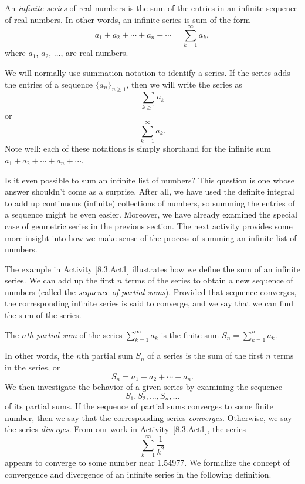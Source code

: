 \begin{definition} An \emph{infinite series} of real numbers is the sum of the entries in an infinite sequence of real numbers. In other words, an infinite series is sum of the form
 \[a_1+a_2+ \cdots + a_n + \cdots = \sum_{k=1}^{\infty} a_k,\]
where $a_1$, $a_2$, $\ldots$, are real numbers. 
\end{definition}

We will normally use summation notation to identify a series. If the series adds the entries of a sequence $\{a_n\}_{n \geq 1}$, then we will write the series as
\[\sum_{k \geq 1} a_k\]
or
\[\sum_{k=1}^{\infty} a_k.\]
Note well: each of these notations is simply shorthand for the infinite sum $a_1 + a_2 + \cdots + a_n + \cdots$.

Is it even possible to sum an infinite list of numbers?  This question is one whose answer shouldn't come as a surprise. After all, we have used the definite integral to add up continuous (infinite) collections of numbers, so summing the entries of a sequence might be even easier.  Moreover, we have already examined the special case of geometric series in the previous section. The next activity provides some more insight into how we make sense of the process of summing an infinite list of numbers.



The example in Activity \ref{8.3.Act1} illustrates how we define the sum of an infinite series. We can add up the first $n$ terms of the series to obtain a new sequence of numbers (called the \emph{sequence of partial sums}). Provided that sequence converges, the corresponding infinite series is said to converge, and we say that we can find the sum of the series.

\begin{definition} The \emph{$n$th partial sum} of the series $\sum_{k=1}^{\infty} a_k$
is the finite sum
$S_n = \sum_{k=1}^{n} a_k.$
\end{definition}
In other words, the $n$th partial sum $S_n$ of a series is the sum of the first $n$ terms in the series, or
\[S_n = a_1 + a_2 + \cdots + a_n.\]
We then investigate the behavior of a given series by examining the sequence
\[S_1, S_2, \ldots, S_n, \ldots\]
of its partial sums.  If the sequence of partial sums converges to some finite number, then we say that the corresponding series \emph{converges}. Otherwise, we say the series \emph{diverges}. From our work in Activity~\ref{8.3.Act1}, the series
\[\sum_{k=1}^{\infty} \frac{1}{k^2}\]
appears to converge to some number near 1.54977.  We formalize the concept of convergence and divergence of an infinite series in the following definition.

